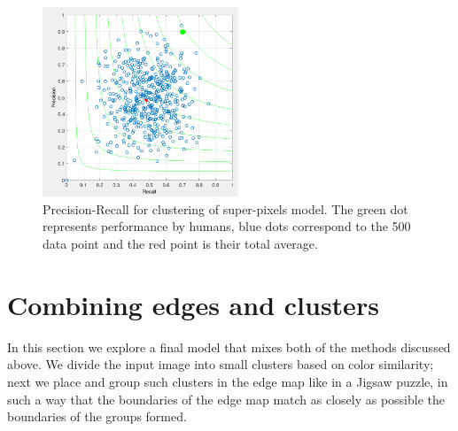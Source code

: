 \documentclass[10pt, twocolumn, twoside]{article}
\newcommand{\squeezeup}{\vspace{-2.5mm}}
\begin{document}
\begin{figure}[ht]
	\centering
	\includegraphics[width=2.3in]{images/F-supixel.png}
    \caption{Precision-Recall for clustering of super-pixels model. The green dot represents performance by humans, blue dots correspond to the 500 data point and the red point is their total average.}
    \label{fig:F-supixel}
\end{figure}

\squeezeup
\section{Combining edges and clusters}
\squeezeup
In this section we explore a final model that mixes both of the methods discussed above. We divide the input image into small clusters based on color similarity; next we place and group such clusters in the edge map like in a Jigsaw puzzle, in such a way that the boundaries of the edge map match as closely as possible the boundaries of the groups formed. 
\end{document}
